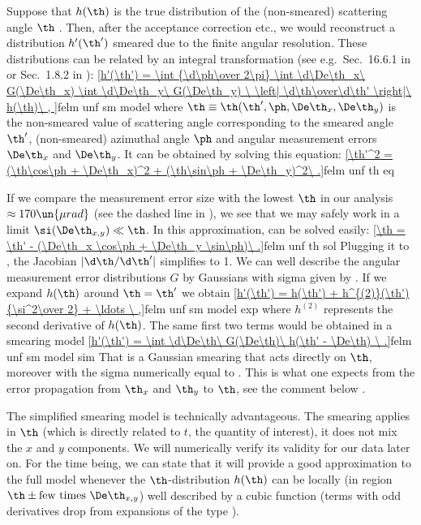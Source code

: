 Suppose that $h(\th)$ is the true distribution of the (non-smeared) scattering angle $\th$
. Then, after the acceptance correction etc., we would reconstruct a distribution $h'(\th')$ smeared due to the finite angular resolution. These distributions can be related by an integral transformation (see e.g.~Sec.~16.6.1 in  or Sec.~1.8.2 in ):
\eqref{h'(\th') = \int {\d\ph\over 2\pi} \int \d\De\th_x\ G(\De\th_x) \int \d\De\th_y\ G(\De\th_y)
	\ \left| \d\th\over\d\th' \right|\ h(\th)\ ,
}{felm unf sm model}
where $\th \equiv \th(\th', \ph, \De\th_x, \De\th_y)$ is the non-smeared value of scattering angle corresponding to the smeared angle $\th'$, (non-smeared) azimuthal angle $\ph$ and angular measurement errors $\De\th_x$ and $\De\th_y$. It can be obtained by solving this equation:
\eqref{\th'^2 = (\th\cos\ph + \De\th_x)^2 + (\th\sin\ph + \De\th_y)^2\ .}{felm unf th eq}

If we compare the measurement error size  with the lowest $\th$ in our analysis $\approx 170\un{\mu rad}$ (see the dashed line in ), we see that we may safely work in a limit $\si(\De\th_{x, y}) \ll \th$. In this approximation,  can be solved easily:
\eqref{\th = \th' - (\De\th_x \cos\ph + \De\th_y \sin\ph)\ .}{felm unf th sol}
Plugging it to , the Jacobian $|\d\th/\d\th'|$ simplifies to 1. We can well describe the angular measurement error distributions $G$ by Gaussians with sigma given by . If we expand $h(\th)$ around $\th = \th'$ we obtain
\eqref{h'(\th') = h(\th') + h^{(2)}(\th') {\si^2\over 2} + \ldots \ ,}{felm unf sm model exp}
where $h^{(2)}$ represents the second derivative of $h(\th)$. The same first two terms would be obtained in a smearing model
\eqref{h'(\th') = \int \d\De\th\ G(\De\th)\ h(\th' - \De\th)  \ .}{felm unf sm model sim}
That is a Gaussian smearing that acts directly on $\th$, moreover with the sigma numerically equal to . This is what one expects from the error propagation from $\th_x$ and $\th_y$ to $\th$, see the comment below .

The simplified smearing model  is technically advantageous. The smearing applies in $\th$ (which is directly related to $t$, the quantity of interest), it does not mix the $x$ and $y$ components. We will numerically verify its validity for our data later on. For the time being, we can state that it will provide a good approximation to the full model  whenever the $\th$-distribution $h(\th)$ can be locally (in region $\th \pm \hbox{few times }\De\th_{x, y}$) well described by a cubic function (terms with odd derivatives drop from expansions of the type ).

